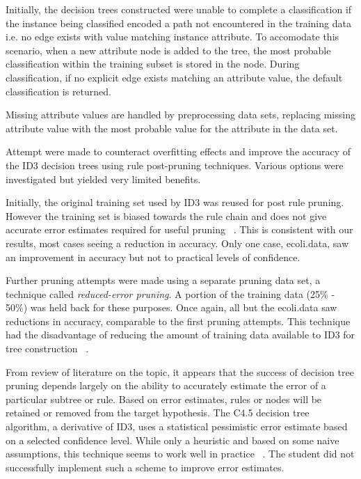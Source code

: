 \documentclass[10pt]{report}
\begin{document}
Initially, the decision trees constructed were unable to complete a
classification if the instance being classified encoded a path not
encountered in the training data i.e. no edge exists with value
matching instance attribute. To accomodate this scenario, when a new
attribute node is added to the tree, the most probable classification
within the training subset is stored in the node. During
classification, if no explicit edge exists matching an attribute  
value, the default classification is returned.

Missing attribute values are handled by preprocessing data sets,
replacing missing attribute value with the most probable value for the
attribute in the data set.

Attempt were made to counteract overfitting effects and improve the
accuracy of the ID3 decision trees using rule post-pruning
techniques. Various options were investigated but yielded very limited
benefits.

Initially, the original training set used by ID3 was reused for post
rule pruning. However the training set is biased towards the rule
chain and does not give accurate error estimates required for useful
pruning ~\cite{Frank2000}. This is consistent with our results, most
cases seeing a reduction in accuracy. Only one case,
ecoli.data, saw an improvement in accuracy but not to practical
levels of confidence.

Further pruning attempts were made using a separate pruning data set,
a technique called \textit{reduced-error pruning}. A portion of the training
data (25\% - 50\%) was held back for these purposes. Once again, all
but the ecoli.data saw reductions in accuracy, comparable to
the first pruning attempts. This technique had the disadvantage of
reducing the amount of training data available to ID3 for tree
construction ~\cite{Frank2000}.

From review of literature on the topic, it appears
that the success of decision tree pruning depends largely on the
ability to accurately estimate the error of a particular subtree or
rule. Based on error estimates, rules or nodes will be retained or
removed from the target hypothesis. The C4.5 decision tree algorithm,
a derivative of ID3, uses a statistical pessimistic error estimate
based on a selected confidence level. While only a heuristic and based
on some naive assumptions, this technique seems to work well in
practice ~\cite{Frank2000}. The student did not successfully implement
such a scheme to improve error estimates.
\end{document}
